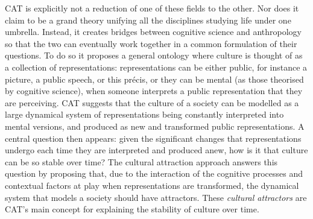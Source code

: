 \documentclass[english,]{article}
\begin{document}
CAT is explicitly not a reduction of one of these fields to the other.
Nor does it claim to be a grand theory unifying all the disciplines studying life under one umbrella.
Instead, it creates bridges between cognitive science and anthropology so that the two can eventually work together in a common formulation of their questions.
To do so it proposes a general ontology where culture is thought of as a collection of representations:
representations can be either public, for instance a picture, a public speech, or this précis, or they can be mental (as those theorised by cognitive science), when someone interprets a public representation that they are perceiving.
CAT suggests that the culture of a society can be modelled as a large dynamical system of representations being constantly interpreted into mental versions, and produced as new and transformed public representations.
A central question then appears:
given the significant changes that representations undergo each time they are interpreted and produced anew, how is it that culture can be so stable over time?
The cultural attraction approach answers this question by proposing that, due to the interaction of the cognitive processes and contextual factors at play when representations are transformed, the dynamical system that models a society should have attractors.
These \emph{cultural attractors} are CAT's main concept for explaining the stability of culture over time.



\end{document}
